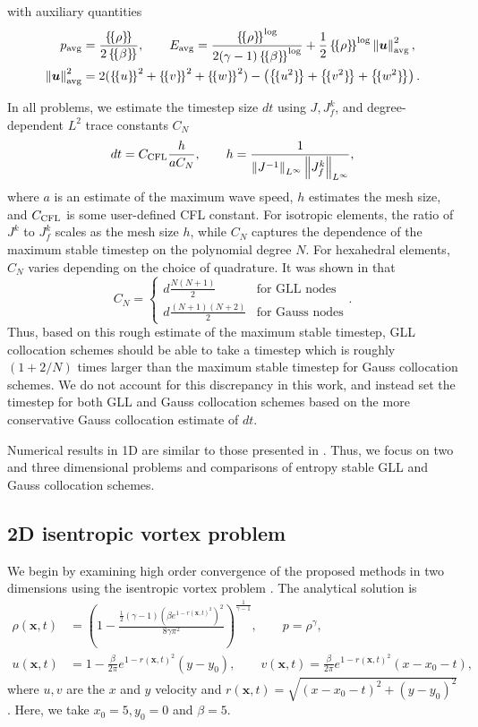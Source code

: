 \documentclass[review,onefignum,onetabnum,final]{siamart171218}
\newcommand{\nor}[1]{\left\| #1 \right\|}
\newcommand{\LRp}[1]{\left( #1 \right)}
\newcommand{\LRc}[1]{\left\{ #1 \right\}}
\newcommand{\avg}[1] {\ensuremath{\LRc{\!\{#1\}\!}}}
\begin{document}
with auxiliary quantities 
\begin{align*}
p_{\rm avg} &= \frac{\avg{\rho}}{2\avg{\beta}}, \qquad E_{\rm avg} = \frac{\avg{\rho}^{\log}}{2(\gamma-1)\avg{\beta}^{\log}} + \frac{1}{2}\avg{\rho}^{\log}\nor{\bm{u}}^2_{\rm avg}, \\
\nor{\bm{u}}^2_{\rm avg} &= 2(\avg{u}^2 + \avg{v}^2 + \avg{w}^2) - \LRp{\avg{u^2} +\avg{v^2} + \avg{w^2}}.\nonumber
\end{align*}

In all problems, we estimate the timestep size $dt$ using $J, J^k_f$, and degree-dependent $L^2$ trace constants $C_N$ 
\[
dt = C_{\rm CFL}\frac{ h}{ a C_N}, \qquad h = \frac{1}{{\nor{J^{-1}}_{L^{\infty}}}\nor{J^k_f}_{L^{\infty}}},
\]
where $a$ is an estimate of the maximum wave speed, $h$ estimates the mesh size, and $C_{\rm CFL}$ is some user-defined CFL constant.  For isotropic elements, the ratio of $J^k$ to $J^k_f$ scales as the mesh size $h$, while $C_N$ captures the dependence of the maximum stable timestep on the polynomial degree $N$.  For hexahedral elements, $C_N$ varies depending on the choice of quadrature.  It was shown in \cite{chan2015gpu} that 
\[
C_N =\begin{cases}
 d\frac{N(N+1)}{2} & \text{for GLL nodes}\\
d\frac{(N+1)(N+2)}{2} & \text{for Gauss nodes}
\end{cases}.
\]
Thus, based on this rough estimate of the maximum stable timestep, GLL collocation schemes should be able to take a timestep which is roughly $(1 + 2/N)$ times larger than the maximum stable timestep for Gauss collocation schemes.  We do not account for this discrepancy in this work, and instead set the timestep for both GLL and Gauss collocation schemes based on the more conservative Gauss collocation estimate of $dt$.  %

Numerical results in 1D are similar to those presented in \cite{chan2017discretely}.  Thus, we focus on two and three dimensional problems and comparisons of entropy stable GLL and Gauss collocation schemes.  

\subsection{2D isentropic vortex problem}

We begin by examining high order convergence of the proposed methods in two dimensions using the isentropic vortex problem \cite{shu1998essentially, crean2017high}.  The analytical solution is 
\begin{align}
\rho(\bm{x},t) &= \LRp{1 - \frac{\frac{1}{2}(\gamma-1)(\beta e^{1-r(\bm{x},t)^2})^2}{8\gamma \pi^2}}^{\frac{1}{\gamma-1}}, \qquad p = \rho^{\gamma},\\
u(\bm{x},t) &= 1 - \frac{\beta}{2\pi} e^{1-r(\bm{x},t)^2}(y-y_0), \qquad v(\bm{x},t) = \frac{\beta}{2\pi} e^{1-r(\bm{x},t)^2}(x-x_0-t),\nonumber
\end{align}
where $u, v$ are the $x$ and $y$ velocity and $r(\bm{x},t) = \sqrt{(x-x_0-t)^2 + (y-y_0)^2}$.  Here, we take $x_0 = 5, y_0 = 0$ and $\beta = 5$.  
\end{document}
